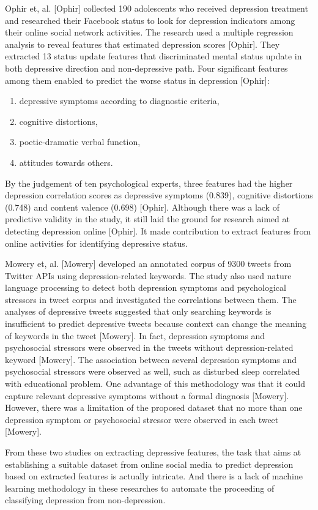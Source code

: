 \documentclass[runningheads]{llncs}
\begin{document}
Ophir et, al. [Ophir] collected 190 adolescents who received depression treatment and researched their Facebook status to look for depression indicators among their online social network activities. The research used a multiple regression analysis to reveal features that estimated depression scores [Ophir]. They extracted 13 status update features that discriminated mental status update in both depressive direction and non-depressive path. Four significant features among them enabled to predict the worse status in depression [Ophir]: 
\begin{enumerate}[label=\alph*)]
	\item depressive symptoms according to diagnostic criteria, 
	\item cognitive distortions,
	\item poetic-dramatic verbal function,
	\item attitudes towards others.
\end{enumerate}
By the judgement of ten psychological experts, three features had the higher depression correlation scores as depressive symptoms (0.839), cognitive distortions (0.748) and content valence (0.698) [Ophir]. Although there was a lack of predictive validity in the study, it still laid the ground for research aimed at detecting depression online [Ophir]. It made contribution to extract features from online activities for identifying depressive status.

Mowery et, al. [Mowery] developed an annotated corpus of 9300 tweets from Twitter APIs using depression-related keywords. The study also used nature language processing to detect both depression symptoms and psychological stressors in tweet corpus and investigated the correlations between them. The analyses of depressive tweets suggested that only searching keywords is insufficient to predict depressive tweets because context can change the meaning of keywords in the tweet [Mowery]. In fact, depression symptoms and psychosocial stressors were observed in the tweets without depression-related keyword [Mowery]. The association between several depression symptoms and psychosocial stressors were observed as well, such as disturbed sleep correlated with educational problem. One advantage of this methodology was that it could capture relevant depressive symptoms without a formal diagnosis [Mowery]. However, there was a limitation of the proposed dataset that no more than one depression symptom or psychosocial stressor were observed in each tweet [Mowery].

From these two studies on extracting depressive features, the task that aims at establishing a suitable dataset from online social media to predict depression based on extracted features is actually intricate. And there is a lack of machine learning methodology in these researches to automate the proceeding of classifying depression from non-depression.
%
%
%
\end{document}
